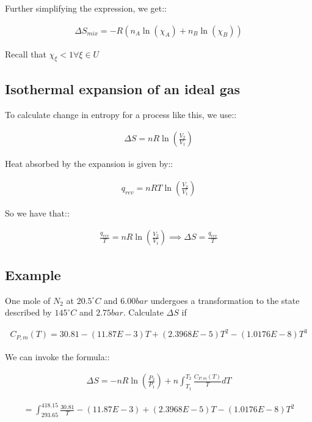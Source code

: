 \documentclass[12pt]{book}
\begin{document}
Further simplifying the expression, we get::

\begin{align*}
    \Delta S_{mix}=-R(n_A\ln(\chi_A)+n_B\ln(\chi_B))
\end{align*}

Recall that $\chi_{\xi}<1\forall \xi\in U$

\subsection*{Isothermal expansion of an ideal gas}

To calculate change in entropy for a process like this, we use::

\begin{align*}
    \Delta S=nR\ln(\frac{V_2}{V_1})
\end{align*}

Heat absorbed by the expansion is given by::

\begin{align*}
    q_{rev}=nRT\ln\left(\frac{V_2}{V_1}\right)
\end{align*}

So we have that::

\begin{align*}
    \frac{q_{rev}}{T}=nR\ln\left(\frac{V_2}{V_1}\right)\implies \Delta S=\frac{q_{rev}}{T}
\end{align*}

\subsection*{Example}
One mole of $N_2$ at $20.5^{\circ}C$ and $6.00 bar$ undergoes a transformation to the state described by $145^{\circ}C$ and $2.75 bar$. Calculate $\Delta S$ if

\begin{align*}
    C_{P,m}(T)=30.81-(11.87E-3)T+(2.3968E-5)T^2-(1.0176E-8)T^3
\end{align*}

We can invoke the formula::

\begin{align*}
    \Delta S=-nR\ln(\frac{P_2}{P_1})+n\int_{T_1}^{T_2}\frac{C_{P,m}(T)}{T}dT
\end{align*}

\begin{align*}
    =\int_{293.65}^{418.15}\frac{30.81}{T}-(11.87E-3)+(2.3968E-5)T-(1.0176E-8)T^2
\end{align*}
\end{document}
